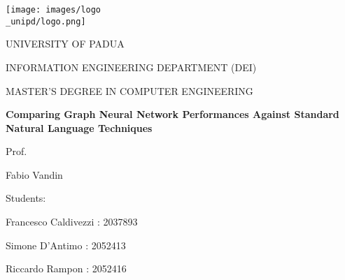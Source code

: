 \begin{titlepage}
    \begin{center}
        \texttt{[image: images/logo\\\_unipd/logo.png]}
        
        \vspace*{1cm}
        \Large
        \textmd{UNIVERSITY OF PADUA}
        
        \vspace*{1cm}
        \large
        \textmd{INFORMATION ENGINEERING DEPARTMENT (DEI)}
                
        \vspace*{0.5cm}
        \large
        \textmd{MASTER'S DEGREE IN COMPUTER ENGINEERING} 
                
        \vspace*{1cm}
        \Huge
        \textbf{Comparing Graph Neural Network Performances Against Standard Natural Language Techniques}
        
        
        \raggedright
        \vspace*{1cm}
        \large
        \textmd{Prof.}
        
        \textmd{Fabio Vandin}
        
        \raggedleft
        \vspace*{0.5cm}
        \large
        \textmd{Students:}
                
        \textmd{Francesco Caldivezzi : 2037893}       
        
        \textmd{Simone D'Antimo : 2052413}        
        
        \textmd{Riccardo Rampon : 2052416}
        
    \end{center}
\end{titlepage}